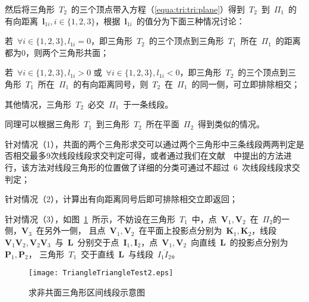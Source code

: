 然后将三角形~$T_2$~的三个顶点带入方程（\ref{equa:tri:tri:plane}）得到~$T_2$~到~$\Pi_1$~的有向距离~$\bm{l}_{1i}, i \in \{1,2,3\}$，根据~$\bm{l}_{1i}$~的值分为下面三种情况讨论：\\ \indent
\begin{inparaenum}[(1)]
  \item 若~$\forall i \in \{1,2,3\}, l_{1i} = 0$，即三角形~$T_2$~的三个顶点到三角形~$T_1$~所在~$\Pi_1$~的距离都为$0$，则两个三角形共面；\\ \indent
  \item 若~$\forall i \in \{1,2,3\}, l_{1i} > 0$ 或~$\forall i \in \{1,2,3\}, l_{1i} < 0$，即三角形~$T_2$~的三个顶点到三角形~$T_1$~所在~$\Pi_1$~的有向距离同号，则~$T_2$~在~$\Pi_1$~的同一侧，可立即排除相交；\\ \indent
  \item 其他情况，三角形~$T_2$~必交~$\Pi_1$~于一条线段。
\end{inparaenum}

同理可以根据三角形~$T_1$~到三角形~$T_2$~所在平面~$\Pi_2$~得到类似的情况。

针对情况（1），共面的两个三角形求交可以通过两个三角形中三条线段两两判定是否相交最多9次线段线段求交判定可得，或者通过我们在文献~~中提出的方法进行，该方法对线段三角形的位置做了详细的分类可通过不超过~6~次线段线段求交判定；

针对情况（2），计算出有向距离同号后即可排除相交立即返回；

针对情况（3），如图~\ref{fig:two:triangle:ui2}~所示，不妨设在三角形~$T_1$~中，点~$\bm{V}_1, \bm{V}_2$~在~$\Pi_2$的一侧，$\bm{V}_3$~在另外一侧，
且点~$\bm{V}_1, \bm{V}_2$~在平面上投影点分别为~$\bm{K}_1,\bm{K}_2$，线段~$\bm{V}_1\bm{V}_2, \bm{V}_2\bm{V}_3$~与~$\bm{L}$~分别交于点~$\bm{I}_1,\bm{I}_2$，点~$\bm{V}_1,\bm{V}_2$~向直线~$\bm{L}$~的投影点分别为~$\bm{P}_1,\bm{P}_2$，
三角形~$T_1$~交于直线~$\bm{L}$~与线段~$\overline{I_1I_2}$。%

\begin{figure}[htbp]
  \centering
    \texttt{[image: TriangleTriangleTest2.eps]}
    \caption{求非共面三角形区间线段示意图\cite{Moller1997}}
  \label{fig:two:triangle:ui2}
\end{figure}

